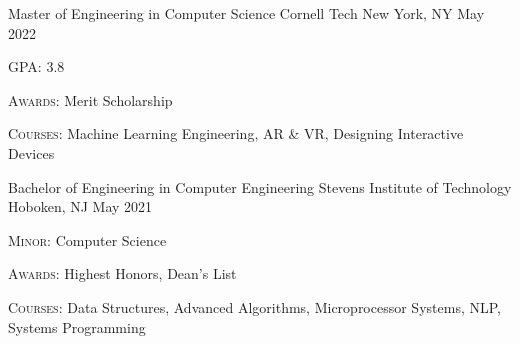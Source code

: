 

\begin{cventries}

  \cventry
  {Master of Engineering in Computer Science} %
  {Cornell Tech} %
  {New York, NY} %
  {May 2022} %
  {
    \begin{cvitems}
      \item \textsc{GPA:} 3.8
      \item \textsc{Awards:} Merit Scholarship
      \item \textsc{Courses:} Machine Learning Engineering, AR \& VR, Designing Interactive Devices
    \end{cvitems}
  }

  \cventry
  {Bachelor of Engineering in Computer Engineering} %
  {Stevens Institute of Technology} %
  {Hoboken, NJ} %
  {May 2021} %
  {
    \begin{cvitems} %
      \item \textsc{Minor:} Computer Science
      \item \textsc{Awards:} Highest Honors, Dean's List
      \item \textsc{Courses:} Data Structures, Advanced Algorithms, Microprocessor Systems, NLP, Systems Programming
    \end{cvitems}
  }

\end{cventries}
